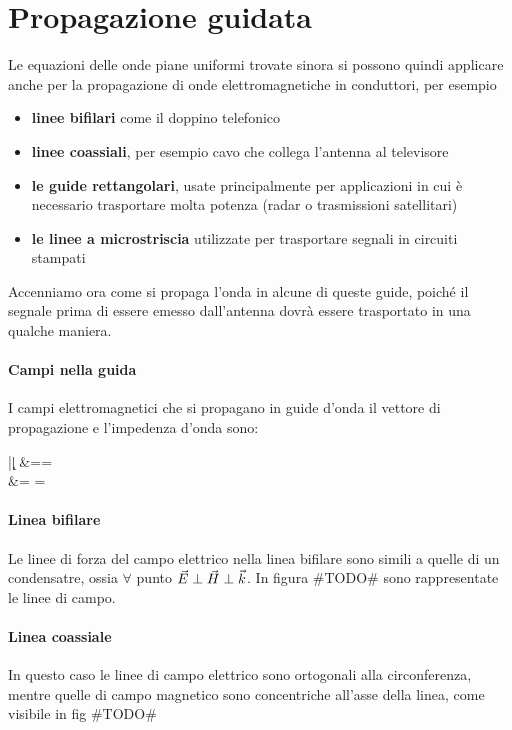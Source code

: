 \section{Propagazione guidata}%
Le equazioni delle onde piane uniformi trovate sinora si possono quindi applicare anche per la propagazione di onde elettromagnetiche in conduttori, per esempio
\begin{itemize}%
  \item \textbf{linee bifilari} come il doppino telefonico
  \item \textbf{linee coassiali}, per esempio  cavo che collega l'antenna al televisore
  \item \textbf{le guide rettangolari}, usate principalmente per applicazioni in cui è necessario trasportare molta potenza (radar o trasmissioni satellitari)
  \item \textbf{le linee a microstriscia} utilizzate per trasportare segnali in circuiti stampati
\end{itemize}
Accenniamo ora come si propaga l'onda in alcune di queste guide, poiché il segnale prima di essere emesso dall'antenna dovrà essere trasportato in una qualche maniera.
\paragraph{Campi nella guida}

I campi elettromagnetici che si propagano in guide d'onda il vettore di propagazione  e l'impedenza d'onda sono:
\begin{esp}
  |\k| &=\beta= \omega \sqrt{\mu \epsilon} \\
  \eta &=  = \sqrt{\frac{\mu}{\epsilon}}
\end{esp}

\paragraph{Linea bifilare}
Le linee di forza del campo elettrico nella linea bifilare sono simili a quelle di un condensatre, ossia $\forall$ punto $\vec{E}\perp\vec{H}\perp\vec{k}$. In figura \#TODO\# sono rappresentate le linee di campo.

\paragraph{Linea coassiale}
In questo caso le linee di campo elettrico sono ortogonali alla circonferenza, mentre quelle di campo magnetico sono concentriche all'asse della linea, come visibile in fig \#TODO\#

